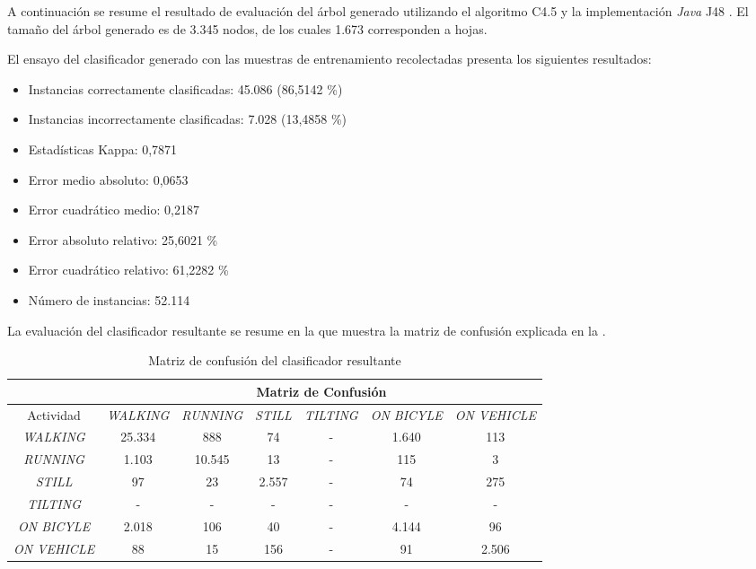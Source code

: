 A continuación se resume el resultado de evaluación del árbol generado
utilizando el algoritmo C4.5 y la implementación \emph{Java} J48 \cite{Frank2016b}.
El tamaño del árbol generado es de 3.345 nodos, de los cuales 1.673
corresponden a hojas.

El ensayo del clasificador generado con las muestras de entrenamiento
recolectadas presenta los siguientes resultados: 
\begin{itemize}
\item Instancias correctamente clasificadas: 45.086 (86,5142 \%)
\item Instancias incorrectamente clasificadas: 7.028 (13,4858 \%)
\item Estadísticas Kappa: 0,7871 
\item Error medio absoluto: 0,0653 
\item Error cuadrático medio: 0,2187 
\item Error absoluto relativo: 25,6021 \% 
\item Error cuadrático relativo: 61,2282 \% 
\item Número de instancias: 52.114 
\end{itemize}
La evaluación del clasificador resultante se resume en la 
que muestra la matriz de confusión explicada en la . 

\begin{table}[h]
\begin{centering}
\begin{tabular}{|c|c|c|c|c|c|c|}
\cline{2-7} 
\multicolumn{1}{c|}{} & \multicolumn{6}{c|}{Matriz de Confusión}\tabularnewline
\hline 
Actividad & \emph{\footnotesize{}WALKING} & \emph{\footnotesize{}RUNNING} & \emph{\footnotesize{}STILL} & \emph{\footnotesize{}TILTING} & \emph{\footnotesize{}ON BICYLE} & \emph{\footnotesize{}ON VEHICLE}\tabularnewline
\hline 
\hline 
\emph{\footnotesize{}WALKING} & 25.334 & 888 & 74 & - & 1.640 & 113\tabularnewline
\hline 
\emph{\footnotesize{}RUNNING} & 1.103 & 10.545 & 13 & - & 115 & 3\tabularnewline
\hline 
\emph{\footnotesize{}STILL} & 97 & 23 & 2.557 & - & 74 & 275\tabularnewline
\hline 
\emph{\footnotesize{}TILTING} & - & - & - & - & - & -\tabularnewline
\hline 
\emph{\footnotesize{}ON BICYLE} & 2.018 & 106 & 40 & - & 4.144 & 96\tabularnewline
\hline 
\emph{\footnotesize{}ON VEHICLE} & 88 & 15 & 156 & - & 91 & 2.506\tabularnewline
\hline 
\end{tabular}
\par\end{centering}
\caption{\label{tab6:matriz-confusion}Matriz de confusión del clasificador
resultante}
\end{table}

